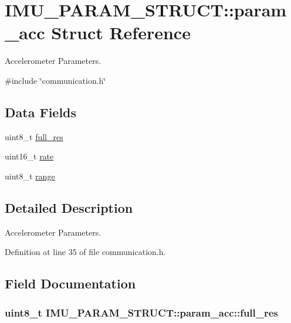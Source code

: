 \hypertarget{structIMU__PARAM__STRUCT_1_1param__acc}{\section{I\-M\-U\-\_\-\-P\-A\-R\-A\-M\-\_\-\-S\-T\-R\-U\-C\-T\-:\-:param\-\_\-acc Struct Reference}
\label{structIMU__PARAM__STRUCT_1_1param__acc}
}


Accelerometer Parameters.  




{\ttfamily \#include \char`\"{}communication.\-h\char`\"{}}

\subsection*{Data Fields}
\begin{DoxyCompactItemize}
\item 
uint8\-\_\-t \hyperlink{structIMU__PARAM__STRUCT_1_1param__acc_af57da5d956ffa7e49a184326b6b9c738}{full\-\_\-res}
\item 
uint16\-\_\-t \hyperlink{structIMU__PARAM__STRUCT_1_1param__acc_a30e6a318cad098cd8379416705820f95}{rate}
\item 
uint8\-\_\-t \hyperlink{structIMU__PARAM__STRUCT_1_1param__acc_a26199b298ef2d353192dfbc706bce8cf}{range}
\end{DoxyCompactItemize}


\subsection{Detailed Description}
Accelerometer Parameters. 

Definition at line 35 of file communication.\-h.



\subsection{Field Documentation}
\hypertarget{structIMU__PARAM__STRUCT_1_1param__acc_af57da5d956ffa7e49a184326b6b9c738}{
\subsubsection[{full\-\_\-res}]{\setlength{\rightskip}{0pt plus 5cm}uint8\-\_\-t I\-M\-U\-\_\-\-P\-A\-R\-A\-M\-\_\-\-S\-T\-R\-U\-C\-T\-::param\-\_\-acc\-::full\-\_\-res}}\label{structIMU__PARAM__STRUCT_1_1param__acc_af57da5d956ffa7e49a184326b6b9c738}


